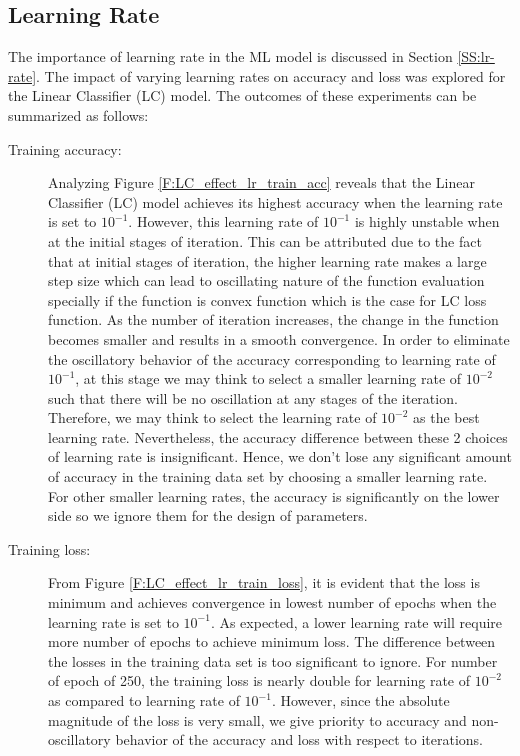 \documentclass[12pt, a4paper, twoside]{article}
\begin{document}
\subsection{Learning Rate}\label{SS:lc-rate}
The importance of learning rate in the ML model is discussed in Section \ref{SS:lr-rate}. The impact of varying learning rates on accuracy and loss was explored for the Linear Classifier (LC) model. The outcomes of these experiments can be summarized as follows:
\begin{description}
	\item[Training accuracy:] Analyzing Figure \ref{F:LC_effect_lr_train_acc} reveals that the Linear Classifier (LC) model achieves its highest accuracy when the learning rate is set to $10^{-1}$. However, this learning rate of $10^{-1}$ is highly unstable when at the initial stages of iteration. This can be attributed due to the fact that at initial stages of iteration, the higher learning rate makes a large step size which can lead to oscillating nature of the function evaluation specially if the function is convex function which is the case for LC loss function. As the number of iteration increases, the change in the function becomes smaller and results in a smooth convergence. In order to eliminate the oscillatory behavior of the accuracy corresponding to learning rate of $10^{-1}$, at this stage we may think to select a smaller learning rate of $10^{-2}$ such that there will be no oscillation at any stages of the iteration. 
	Therefore, we may think to select the learning rate of $10^{-2}$  as the best learning rate. Nevertheless, the accuracy difference between these 2 choices of learning rate is insignificant. Hence, we don't lose any significant amount of accuracy in the training data set by choosing a smaller learning rate. For other smaller learning rates, the accuracy is significantly on the lower side so we ignore them for the design of parameters.
	\item[Training loss:] From Figure \ref{F:LC_effect_lr_train_loss}, it is evident that the loss is minimum and achieves convergence in lowest number of epochs when the learning rate is set to $10^{-1}$. As expected, a lower learning rate will require more number of epochs to achieve minimum loss. The difference between the losses in the training data set is too significant to ignore.  For number of epoch of 250, the training loss is nearly double for learning rate of $10^{-2}$ as compared to learning rate of $10^{-1}$. However, since the absolute magnitude of the loss is very small, we give priority to accuracy and non-oscillatory behavior of the accuracy and loss with respect to iterations.

\end{description}
\end{document}
